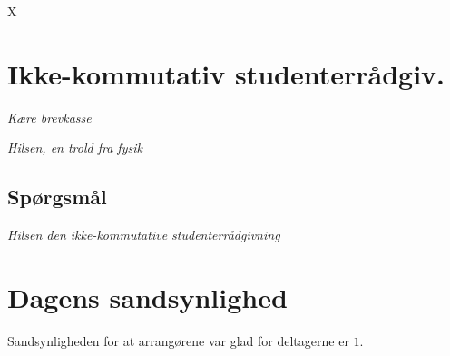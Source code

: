 \begin{minipage}[t]{120mm}
\vspace{3mm}
X
\section*{Ikke-kommutativ studenterrådgiv.}
\emph{Kære brevkasse}


\emph{Hilsen, en trold fra fysik}

\subsection*{Spørgsmål}


{\flushright\emph{Hilsen den ikke-kommutative studenterrådgivning}}

\section*{Dagens sandsynlighed}
Sandsynligheden for at arrangørene var glad for deltagerne er $1$.

\end{minipage}
